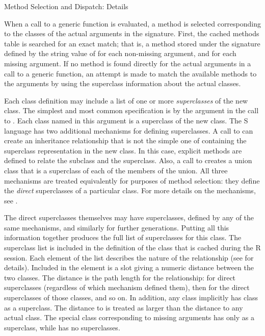 \begin{Section}{Method Selection and Dispatch: Details}

When a call to a generic function is evaluated, a method is selected corresponding
to the classes of the actual arguments in the signature.
First, the cached methods table is searched for an  exact match;
that is, a method stored under the signature defined by
the string value of  for each non-missing
argument, and  for each missing argument.
If no method is found directly for the actual arguments in a call to a
generic function, an attempt is made to match the available methods to
the arguments by using the superclass information about the actual classes.

Each class definition may include a list of  one or more
\emph{superclasses} of the new class.
The simplest and most common specification is by the  argument in
the  call to .
Each class named in this argument is a superclass of the new class.
The S language has two additional mechanisms for defining
superclasses.
A call to 
 can create an inheritance relationship that is not the simple one of
containing the superclass representation in the new class.
In this case, explicit methods are defined to relate the subclass and
the superclass.
Also, a call to  creates a union class that
is a
superclass of each of the members of the union.
All three mechanisms are treated equivalently for purposes of
method selection:  they define the \emph{direct} superclasses of a
particular class.
For more details on the mechanisms, see .

The direct superclasses themselves may
have superclasses, defined by any of the same mechanisms, and
similarly for further generations.  Putting all this information together produces
the full list of superclasses for this class.
The superclass list is included in the definition of the class that is
cached during the R session.
Each element of the list describes the nature of the relationship (see
 for details).
Included in the element is a  slot giving a numeric
distance between the two classes.
The distance is the path length for the relationship:
 for direct superclasses (regardless of which mechanism
defined them), then  for the direct superclasses of those
classes, and so on.
In addition, any class implicitly has class  as a superclass.  The
distance to  is treated as larger than the distance to any
actual class.
The special class  corresponding to missing arguments
has only  as a superclass, while  has no
superclasses.


\end{Section}
